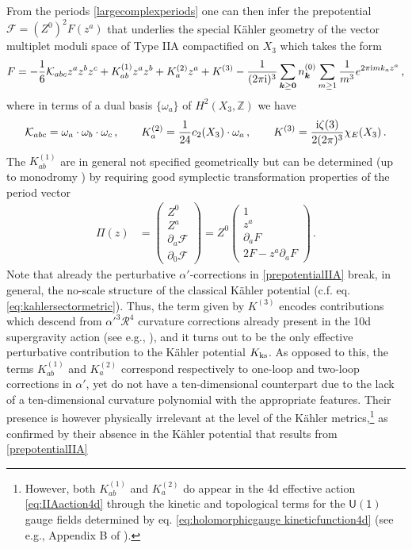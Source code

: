 From the periods \eqref{largecomplexperiods} one can then infer the prepotential $\mathcal{F}= (Z^{0})^2 F (z^a)$ that underlies the special K\"ahler geometry of the vector multiplet moduli space of Type IIA compactified on $X_3$ which takes the form
%
\begin{align}\label{prepotentialIIA}
F =-\frac{1}{6} {\cal K}_{abc} z^a z^b z^c + K_{ab}^{(1)} z^a z^b + K_{a}^{(2)} z^a + K^{(3)} - \frac{1}{(2 \pi \text{i})^3}\sum_{\boldsymbol{k}\geq \boldsymbol{0}} n_{\boldsymbol{k}}^{(0)} \sum_{m \geq 1} \frac{1}{m^3} e^{2\pi \text{i} m k_a z^a}\, , 
\end{align} 
%
where in terms of a dual basis $\lbrace \omega_a \rbrace$ of $H^2(X_3, \mathbb{Z})$ we have
%
\begin{align}
 {\cal K}_{abc}= \omega_a \cdot \omega_b \cdot \omega_c \, ,\qquad K_{a}^{(2)}=\frac{1}{24} c_2(X_3) \cdot \omega_a\, ,\qquad K^{(3)}= \frac{\text{i} \zeta(3)}{2(2\pi)^3} \chi_E(X_3)\, .
\end{align}
%
The $K_{ab}^{(1)}$ are in general not specified geometrically but can be determined (up to monodromy \cite{deWit:1992wf,Harvey:1995fq}) by requiring good symplectic transformation properties of the period vector
%
\begin{align}
    \Pi(z) &= \begin{pmatrix}
           Z^{0} \\
           Z^{a} \\
           \partial_a \mathcal{F} \\
           \partial_0 \mathcal{F}
         \end{pmatrix}=Z^{0} \begin{pmatrix}
           1 \\
           z^{a} \\
           \partial_a F \\
           2F- z^a \partial_a F
         \end{pmatrix}\, .
  \end{align}
%
Note that already the perturbative $\alpha'$-corrections in \eqref{prepotentialIIA} break, in general, the no-scale structure of the classical K\"ahler potential (c.f. eq. \eqref{eq:kahlersectormetric}). Thus, the term given by $K^{(3)}$ encodes contributions which descend from $\alpha'^3 \mathcal{R}^4$ curvature corrections already present in the 10d supergravity action (see e.g., \cite{Green:1999pv, Palti:2008mg,Grimm:2017okk}), and it turns out to be the only effective perturbative contribution to the K\"ahler potential $K_{\rm ks}$. As opposed to this, the terms $K_{ab}^{(1)}$ and $K_{a}^{(2)}$ correspond respectively to one-loop and two-loop corrections in $\alpha'$, yet do not have a ten-dimensional counterpart due to the lack of a ten-dimensional curvature polynomial with the appropriate features. Their presence is however physically irrelevant at the level of the K\"ahler metrics\cite{Escobar:2018rna},\footnote{However, both $K_{ab}^{(1)}$ and $K_{a}^{(2)}$ do appear in the 4d effective action \eqref{eq:IIAaction4d} through the kinetic and topological terms for the $\mathsf{U(1)}$ gauge fields determined by eq. \eqref{eq:holomorphicgauge kineticfunction4d} (see e.g., Appendix B of \cite{Marchesano:2022axe}).} as confirmed by their absence in the K\"ahler potential that results from \eqref{prepotentialIIA}
